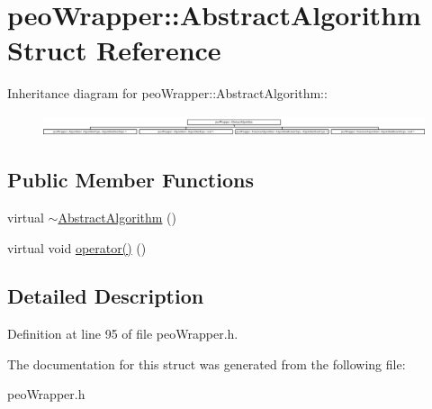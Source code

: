 \hypertarget{structpeoWrapper_1_1AbstractAlgorithm}{
\section{peo\-Wrapper::Abstract\-Algorithm Struct Reference}
\label{structpeoWrapper_1_1AbstractAlgorithm}
}
Inheritance diagram for peo\-Wrapper::Abstract\-Algorithm::\begin{figure}[H]
\begin{center}
\leavevmode
\includegraphics[height=0.614035cm]{structpeoWrapper_1_1AbstractAlgorithm}
\end{center}
\end{figure}
\subsection*{Public Member Functions}
\begin{CompactItemize}
\item 
\hypertarget{structpeoWrapper_1_1AbstractAlgorithm_30a579ba96072332f60989f92de669e9}{
virtual \hyperlink{structpeoWrapper_1_1AbstractAlgorithm_30a579ba96072332f60989f92de669e9}{$\sim$Abstract\-Algorithm} ()}
\label{structpeoWrapper_1_1AbstractAlgorithm_30a579ba96072332f60989f92de669e9}

\item 
\hypertarget{structpeoWrapper_1_1AbstractAlgorithm_a9aa8c613ea6c944b296cf3ba5f6f95b}{
virtual void \hyperlink{structpeoWrapper_1_1AbstractAlgorithm_a9aa8c613ea6c944b296cf3ba5f6f95b}{operator()} ()}
\label{structpeoWrapper_1_1AbstractAlgorithm_a9aa8c613ea6c944b296cf3ba5f6f95b}

\end{CompactItemize}


\subsection{Detailed Description}




Definition at line 95 of file peo\-Wrapper.h.

The documentation for this struct was generated from the following file:\begin{CompactItemize}
\item 
peo\-Wrapper.h\end{CompactItemize}
